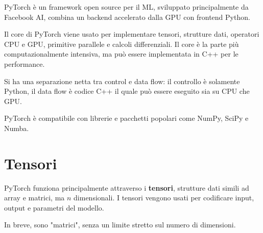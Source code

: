 PyTorch è un framework open source per il ML, sviluppato principalmente da Facebook AI, combina un backend accelerato dalla GPU con frontend Python. 

Il core di PyTorch viene usato per implementare tensori, strutture dati, operatori CPU e GPU, primitive parallele e calcoli differenziali. Il core è la parte più computazionalmente intensiva, ma può essere implementata in C++ per le performance.

Si ha una separazione netta tra control e data flow: il controllo è solamente Python, il data flow è codice C++ il quale può essere eseguito sia su CPU che GPU.

PyTorch è compatibile con librerie e pacchetti popolari come NumPy, SciPy e Numba.

\section{Tensori}

PyTorch funziona principalmente attraverso i \textbf{tensori}, strutture dati simili ad array e matrici, ma $n$ dimensionali. I tensori vengono usati per codificare input, output e parametri del modello.

In breve, sono "matrici", senza un limite stretto sul numero di dimensioni.

